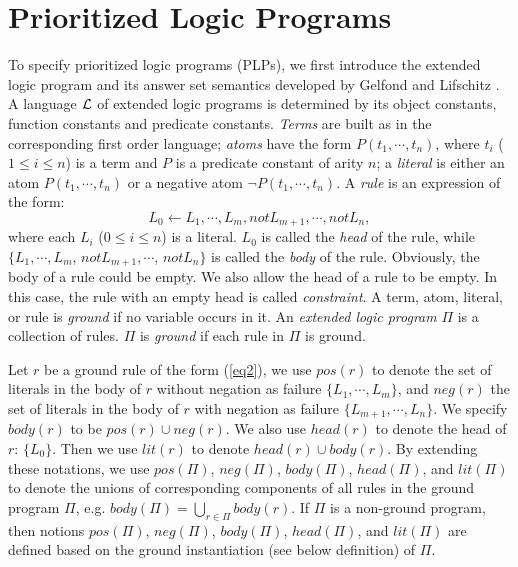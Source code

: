 \documentclass{tlp}
\begin{document}
\section{Prioritized Logic Programs}

To specify prioritized logic programs (PLPs), we first
introduce the extended logic program and its answer set semantics
developed by Gelfond and Lifschitz \cite{gl:logic}.
A language $\cal L$ of extended
logic programs is determined by its object constants, function
constants and predicate constants. {\em Terms} are
built as in the corresponding first order language; {\em atoms}
have the form $P(t_{1},\cdots,t_{n})$, where
$t_{i}$ ($1\leq i\leq n$) is a term and $P$ is a predicate constant of arity $n$;
a {\em literal} is either an atom $P(t_{1},\cdots,t_{n})$ or
a negative atom $\neg P(t_{1},\cdots,t_{n})$.
A {\em rule} is an expression of the form:
\begin{equation}
L_{0}\leftarrow L_{1},\cdots,L_{m}, not L_{m+1},\cdots, not L_{n},
\label{eq2}
\end{equation}
where each $L_{i}$ ($0\leq i\leq n$) is a literal.
$L_{0}$ is called the {\em head} of the rule,
while $\{L_{1},\cdots,L_{m}$, $not L_{m+1},\cdots$,
$not L_{n}\}$ is called the {\em body} of the rule.
Obviously, the body of a
rule could be empty. We also allow the head of a rule to be empty. In 
this case, the rule with an empty head is called {\em constraint}. 
A term, atom, literal, or rule is {\em ground} if no variable
occurs in it.
An {\em extended logic program} $\Pi$ is a collection of rules.
$\Pi$ is {\em ground} if each rule in $\Pi$ is
ground. 

Let $r$ be a ground rule of the form (\ref{eq2}), 
we use $pos(r)$ to denote the set of literals in the body of $r$
without negation as failure
$\{L_{1},\cdots,L_{m}\}$, and $neg(r)$ the set of literals
in the body of $r$ with negation as failure $\{L_{m+1},\cdots,L_{n}\}$. We specify
$body(r)$ to be
$pos(r)\cup neg(r)$. We also use $head(r)$ to denote the head of $r$: $\{L_{0}\}$.
Then we use $lit(r)$ to denote $head(r)\cup body(r)$. By extending these
notations, we use $pos(\Pi)$, $neg(\Pi)$,
$body(\Pi)$, $head(\Pi)$, and $lit(\Pi)$ to denote the unions of
corresponding components of all rules in the ground program $\Pi$, e.g.
$body(\Pi)=\bigcup_{r\in\Pi} body(r)$. If $\Pi$ is a non-ground program,
then notions $pos(\Pi)$, $neg(\Pi)$,
$body(\Pi)$, $head(\Pi)$, and $lit(\Pi)$ are defined based on the ground
instantiation (see below definition) of $\Pi$.
\end{document}
